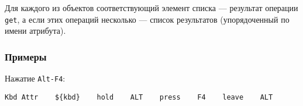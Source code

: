 \documentclass[11pt]{book} %
\begin{document}
Для каждого из объектов соответствующий элемент списка --- результат операции \verb|get|, а если этих операций несколько --- список результатов (упорядоченный по имени атрибута).

\subsubsection*{Примеры}

Нажатие \verb|Alt-F4|:

\begin{verbatim}Kbd Attr    ${kbd}    hold    ALT    press    F4    leave    ALT\end{verbatim}
\end{document}
